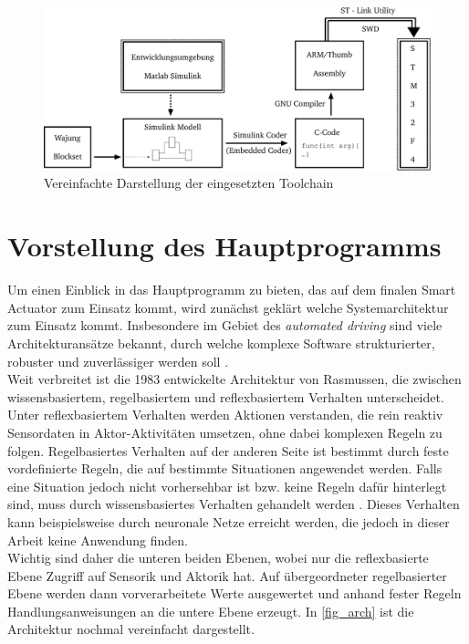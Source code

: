 \begin{figure}[H]%
\centering
\includegraphics[width=0.8\columnwidth]{./Bilder/fig_toolchain}%
\caption{Vereinfachte Darstellung der eingesetzten Toolchain}%
\label{fig_toolchain}%
\end{figure}

\section{Vorstellung des Hauptprogramms}
Um einen Einblick in das Hauptprogramm zu bieten, das auf dem finalen Smart Actuator zum Einsatz kommt, wird zunächst geklärt welche Systemarchitektur zum Einsatz kommt.
Insbesondere im Gebiet des \textit{automated driving} sind viele Architekturansätze bekannt, durch welche komplexe Software strukturierter, robuster und zuverlässiger werden soll \cite{automated}.\\
 Weit verbreitet ist die 1983 entwickelte Architektur von Rasmussen, die zwischen wissensbasiertem, regelbasiertem und reflexbasiertem Verhalten unterscheidet. Unter reflexbasiertem Verhalten werden Aktionen verstanden, die rein reaktiv Sensordaten in Aktor-Aktivitäten umsetzen, ohne dabei komplexen Regeln zu folgen. Regelbasiertes Verhalten auf der anderen Seite ist bestimmt durch feste vordefinierte Regeln, die auf bestimmte Situationen angewendet werden. Falls eine Situation jedoch nicht vorhersehbar ist bzw. keine Regeln dafür hinterlegt sind, muss durch wissensbasiertes Verhalten gehandelt werden . Dieses Verhalten kann beispielsweise durch neuronale Netze erreicht werden, die jedoch in dieser Arbeit keine Anwendung finden. \cite{Rasmussen}\\
Wichtig sind daher die unteren beiden Ebenen, wobei nur die reflexbasierte Ebene Zugriff auf Sensorik und Aktorik hat. Auf übergeordneter regelbasierter Ebene werden dann vorverarbeitete Werte ausgewertet und anhand fester Regeln Handlungsanweisungen an die untere Ebene erzeugt. In \autoref{fig_arch} ist die Architektur nochmal vereinfacht dargestellt.
